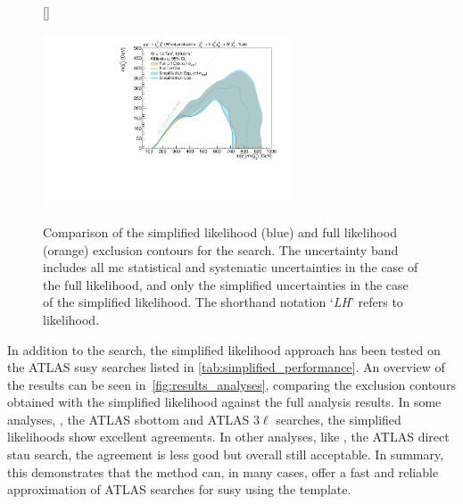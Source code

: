 \begin{figure}
[\FBwidth]
{\caption{Comparison of the simplified likelihood (blue) and full likelihood (orange) exclusion contours for the \onelepton search. The uncertainty band includes all \gls{mc} statistical and systematic uncertainties in the case of the full likelihood, and only the simplified uncertainties in the case of the simplified likelihood. The shorthand notation `\textit{LH}' refers to likelihood.}\label{fig:results_simplify_1Lbb}}
{\includegraphics[width=0.65\textwidth]{exclusion_1Lbb_noLabel}}
\end{figure}

In addition to the \onelepton search, the simplified likelihood approach has been tested on the ATLAS \gls{susy} searches listed in \cref{tab:simplified_performance}. An overview of the results can be seen in~\cref{fig:results_analyses}, comparing the exclusion contours obtained with the simplified likelihood against the full analysis results. In some analyses, \eg, the ATLAS sbottom  and ATLAS $3\ell$ searches, the simplified likelihoods show excellent agreements. In other analyses, like \eg, the ATLAS direct stau search, the agreement is less good but overall still acceptable.
In summary, this demonstrates that the method can, in many cases, offer a fast and reliable approximation of ATLAS searches for \gls{susy} using the  template.


